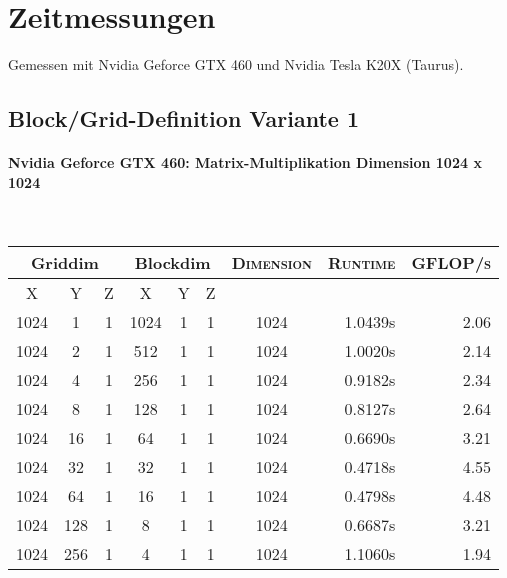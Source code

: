 \section{Zeitmessungen}
Gemessen mit Nvidia Geforce GTX 460 und Nvidia Tesla K20X (Taurus).
\subsection{Block/Grid-Definition Variante 1}
\label{lst:a6-kernel}

\paragraph{Nvidia Geforce GTX 460: Matrix-Multiplikation Dimension 1024 x 1024}\hfill\\
\begin{tabular}{|c|c|c||c|c|c||c|r|r|}
	\hline
	\multicolumn{3}{|c||}{Griddim} & \multicolumn{3}{|c||}{Blockdim} & \textsc{Dimension} & \textsc{Runtime} & \textsc{GFLOP/s} \\
	\hline
	\textsc{X} & \textsc{Y} & \textsc{Z} & \textsc{X} & \textsc{Y} & \textsc{Z} & & & \\
	\hline
	\hline
	1024 & 1 & 1 & 1024 & 1 & 1 & 1024 & 1.0439s  & 2.06 \\ 
	\hline 
	1024 & 2 & 1 & 512 & 1 & 1 & 1024 & 1.0020s  & 2.14 \\ 
	\hline 
	1024 & 4 & 1 & 256 & 1 & 1 & 1024 & 0.9182s  & 2.34 \\ 
	\hline 
	1024 & 8 & 1 & 128 & 1 & 1 & 1024 & 0.8127s  & 2.64 \\ 
	\hline 
	1024 & 16 & 1 & 64 & 1 & 1 & 1024 & 0.6690s  & 3.21 \\ 
	\hline 
	1024 & 32 & 1 & 32 & 1 & 1 & 1024 & 0.4718s  & 4.55 \\ 
	\hline 
	1024 & 64 & 1 & 16 & 1 & 1 & 1024 & 0.4798s  & 4.48 \\ 
	\hline 
	1024 & 128 & 1 & 8 & 1 & 1 & 1024 & 0.6687s  & 3.21 \\ 
	\hline 
	1024 & 256 & 1 & 4 & 1 & 1 & 1024 & 1.1060s  & 1.94 \\ 
	\hline 

\end{tabular}


